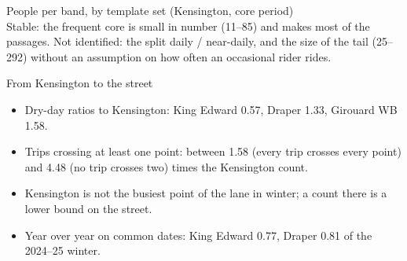 \documentclass[aspectratio=169,10pt]{beamer}\usetheme{default}\usecolortheme{seahorse}\setbeamertemplate{navigation symbols}{}\setbeamertemplate{footline}[frame number]
\begin{document}
\begin{frame}{People per band, by template set (Kensington, core period)}\centering\scriptsize{}\\[6pt]\footnotesize Stable: the frequent core is small in number (11--85) and makes most of the passages. Not identified: the split daily / near-daily, and the size of the tail (25--292) without an assumption on how often an occasional rider rides.\end{frame}
\begin{frame}{From Kensington to the street}\begin{itemize}
\item Dry-day ratios to Kensington: King Edward 0.57, Draper 1.33, Girouard WB 1.58.
\item Trips crossing at least one point: between 1.58 (every trip crosses every point) and 4.48 (no trip crosses two) times the Kensington count.
\item Kensington is not the busiest point of the lane in winter; a count there is a lower bound on the street.
\item Year over year on common dates: King Edward 0.77, Draper 0.81 of the 2024--25 winter.
\end{itemize}\end{frame}
\end{document}
